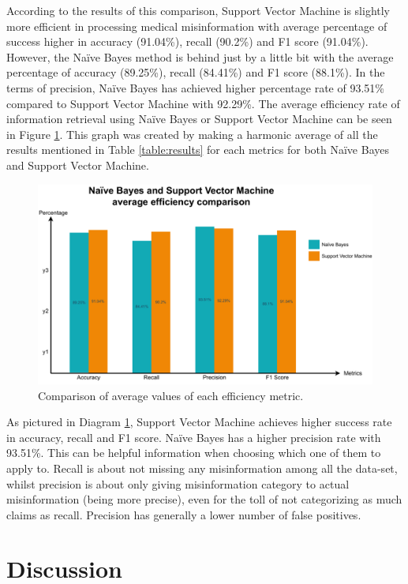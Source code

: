 \documentclass[11pt ,english,a4paper]{article}
\begin{document}
According to the results of this comparison, Support Vector Machine is slightly more efficient in processing medical misinformation with average percentage of success higher in accuracy (91.04\%), recall (90.2\%) and F1 score (91.04\%). However, the Naïve Bayes method is behind just by a little bit with the average percentage of accuracy (89.25\%), recall (84.41\%) and F1 score (88.1\%). In the terms of precision, Naïve Bayes has achieved higher percentage rate of 93.51\% compared to Support Vector Machine with 92.29\%. The average efficiency rate of information retrieval using Naïve Bayes or Support Vector Machine can be seen in Figure \ref{f:average}. This graph was created by making a harmonic average of all the results mentioned in Table \ref{table:results} for each metrics for both Naïve Bayes and Support Vector Machine.

\begin{figure}[H]
\centering
\includegraphics[scale=0.5]{average.pdf}
\caption{\centering Comparison of average values of each efficiency metric.}
\label{f:average}
\end{figure}

As pictured in Diagram \ref{f:average}, Support Vector Machine achieves higher success rate in accuracy, recall and F1 score. Naïve Bayes has a higher precision rate with 93.51\%. This can be helpful information when choosing which one of them to apply to. Recall is about not missing any misinformation among all the data-set, whilst precision is about only giving misinformation category to actual misinformation (being more precise), even for the toll of not categorizing as much claims as recall. Precision has generally a lower number of false positives. 

\section{Discussion}
\end{document}

